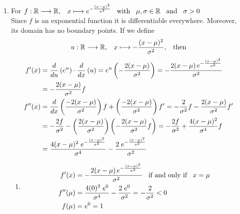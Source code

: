 \documentclass[12pt]{amsart}
\begin{document}
\begin{enumerate}
	\item For $f: \mathbb{R} \longrightarrow \mathbb{R}, \hspace{0.3cm} x\longmapsto 
		e^{-\frac{(x-\mu)^2}{\sigma^2}} \hspace{0.3cm} \text{with} \hspace{0.3cm} \mu, \sigma \in 
		\mathbb{R} \hspace{0.3cm} \text{and} \hspace{0.3cm} \sigma > 0$ \\
		Since $f$ is an exponential function it is differentiable everywhere. Moreover, its domain has no 			boundary points. If we define 
		$$u:\mathbb{R}\longrightarrow\mathbb{R}, \hspace{0.3cm} x \longmapsto
		-\frac{(x-\mu)^2}{\sigma^2}, \hspace{0.3cm} \text{then}$$
			\begin{align}
				f'(x)&= \frac{ d}{du} \left(e^u\right) \cdot \frac{ d}{dx} \left(u\right)=e^u
				\left(-\frac{2(x-\mu)}{\sigma^2}\right) = 
				-\frac{2(x-\mu) \hspace{0.05cm} e^{-\frac{(x-\mu)^2}{\sigma^2}}}{\sigma^2} 
				\notag \\
				&=-\frac{2(x-\mu)}{\sigma^2} f \notag \\
				f''(x)&= \frac{ d}{dx} \left(\frac{-2(x-\mu)}{\sigma^2}\right) f + \left(\frac{-2(x-\mu)}{\sigma^2} 				\right) f' = -\frac{2}{\sigma^2} f - \frac{2(x-\mu)}{\sigma^2} f' \notag \\
				&=-\frac{2f}{\sigma^2} - \left(\frac{2(x-\mu)}{\sigma^2}\right) 
				\left(-\frac{2(x-\mu)}{\sigma^2} f \right) = -\frac{2f}{\sigma^2} + \frac{4(x-\mu)^2}{\sigma^4} f 				\notag \\
				&= \frac{4(x-\mu)^2 \hspace{0.1cm} e^{-\frac{(x-\mu)^2}{\sigma^2}}}{\sigma^4} - 
				\frac{2 \hspace{0.1cm} e^{-\frac{(x-\mu)^2}{\sigma^2}}}{\sigma^2} \notag
			\end{align}
		
		\begin{enumerate}
		
			\item 
				\begin{align}
					f'(x)&=-\frac{2(x-\mu) \hspace{0.05cm} e^{-\frac{(x-\mu)^2}{\sigma^2}}}{\sigma^2} 
 					\hspace{0.3cm} \text{if and only if} \hspace{0.3cm} x=\mu \notag \\
					f''(\mu)&= \frac{4(0)^2 \hspace{0.1cm} e^0}{\sigma^4} - 
					\frac{2 \hspace{0.1cm} e^0}{\sigma^2}=-\frac{2}{\sigma^2}<0 \notag \\
					f(\mu)&=e^0=1 \notag
				\end{align} 
					

\end{enumerate}
\end{enumerate}
\end{document}
